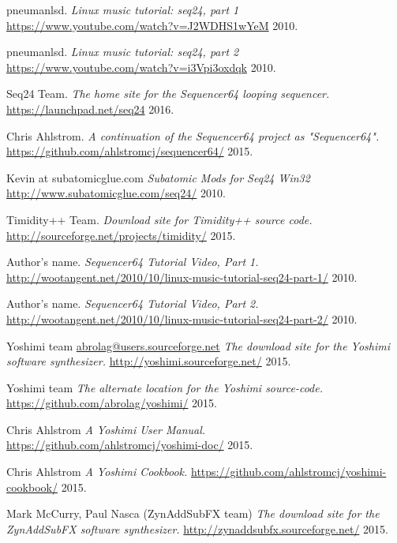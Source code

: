 \begin{thebibliography}{99}
   pneumanlsd.
   \emph{Linux music tutorial: seq24, part 1}
   \url{https://www.youtube.com/watch?v=J2WDHS1wYeM}
   2010.
   
   pneumanlsd.
   \emph{Linux music tutorial: seq24, part 2}
   \url{https://www.youtube.com/watch?v=i3Vpi3oxdqk}
   2010.

   Seq24 Team.
   \emph{The home site for the Sequencer64 looping sequencer.}
   \url{https://launchpad.net/seq24}
   2016.

   Chris Ahlstrom.
   \emph{A continuation of the Sequencer64 project as "Sequencer64".}
   \url{https://github.com/ahlstromcj/sequencer64/}
   2015.

   Kevin at subatomicglue.com
   \emph{Subatomic Mods for Seq24 Win32}
   \url{http://www.subatomicglue.com/seq24/}
   2010.

   Timidity++ Team.
   \emph{Download site for Timidity++ source code.}
   \url{http://sourceforge.net/projects/timidity/}
   2015.

   Author's name.
   \emph{Sequencer64 Tutorial Video, Part 1.}
   \url{http://wootangent.net/2010/10/linux-music-tutorial-seq24-part-1/}
   2010.

   Author's name.
   \emph{Sequencer64 Tutorial Video, Part 2.}
   \url{http://wootangent.net/2010/10/linux-music-tutorial-seq24-part-2/}
   2010.

   Yoshimi team \url{abrolag@users.sourceforge.net}
   \emph{The download site for the Yoshimi software synthesizer.}
   \url{http://yoshimi.sourceforge.net/}
   2015.

   Yoshimi team
   \emph{The alternate location for the Yoshimi source-code.}
   \url{https://github.com/abrolag/yoshimi/}
   2015.

   Chris Ahlstrom
   \emph{A Yoshimi User Manual.}
   \url{https://github.com/ahlstromcj/yoshimi-doc/}
   2015.

   Chris Ahlstrom
   \emph{A Yoshimi Cookbook.}
   \url{https://github.com/ahlstromcj/yoshimi-cookbook/}
   2015.

   Mark McCurry, Paul Nasca (ZynAddSubFX team)
   \emph{The download site for the ZynAddSubFX software synthesizer.}
   \url{http://zynaddsubfx.sourceforge.net/}
   2015.

\end{thebibliography}

